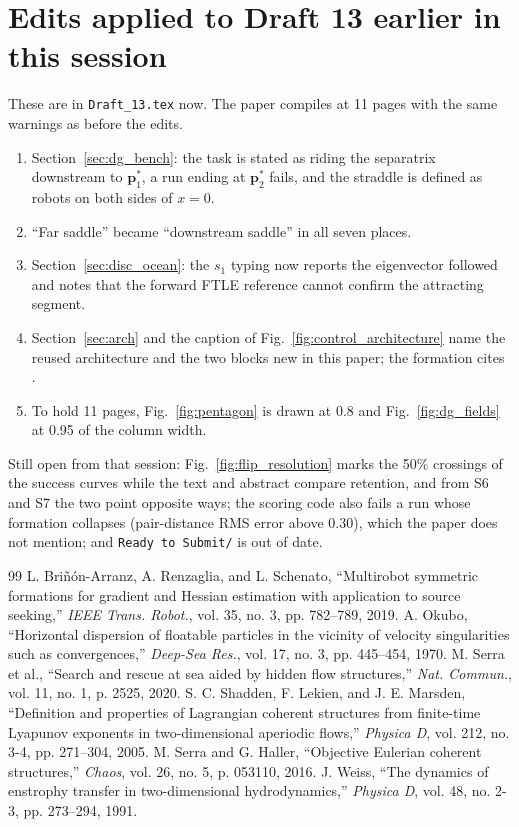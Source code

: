 \documentclass[11pt]{article}
\begin{document}
\section{Edits applied to Draft 13 earlier in this session}

These are in \texttt{Draft\_13.tex} now. The paper compiles at 11 pages
with the same warnings as before the edits.
\begin{enumerate}
\item Section~\ref{sec:dg_bench}: the task is stated as riding the
separatrix downstream to $\mathbf{p}^*_1$, a run ending at
$\mathbf{p}^*_2$ fails, and the straddle is defined as robots on both
sides of $x = 0$.
\item ``Far saddle'' became ``downstream saddle'' in all seven places.
\item Section~\ref{sec:disc_ocean}: the $s_1$ typing now reports the
eigenvector followed and notes that the forward FTLE reference cannot
confirm the attracting segment.
\item Section~\ref{sec:arch} and the caption of
Fig.~\ref{fig:control_architecture} name the reused architecture and the
two blocks new in this paper; the formation cites \cite{5}.
\item To hold 11 pages, Fig.~\ref{fig:pentagon} is drawn at 0.8 and
Fig.~\ref{fig:dg_fields} at 0.95 of the column width.
\end{enumerate}
Still open from that session: Fig.~\ref{fig:flip_resolution} marks the
50\% crossings of the success curves while the text and abstract compare
retention, and from S6 and S7 the two point opposite ways; the scoring
code also fails a run whose formation collapses (pair-distance RMS error
above 0.30), which the paper does not mention; and \texttt{Ready to
Submit/} is out of date.

\nocite{list5,list8,list12,list17,list19,list22}
\begin{thebibliography}{99}
 L. Bri\~{n}\'{o}n-Arranz, A. Renzaglia, and L. Schenato,
``Multirobot symmetric formations for gradient and Hessian estimation with
application to source seeking,'' \textit{IEEE Trans. Robot.}, vol. 35,
no. 3, pp. 782--789, 2019.
 A. Okubo, ``Horizontal dispersion of floatable particles in
the vicinity of velocity singularities such as convergences,''
\textit{Deep-Sea Res.}, vol. 17, no. 3, pp. 445--454, 1970.
 M. Serra et al., ``Search and rescue at sea aided by
hidden flow structures,'' \textit{Nat. Commun.}, vol. 11, no. 1, p. 2525,
2020.
 S. C. Shadden, F. Lekien, and J. E. Marsden,
``Definition and properties of Lagrangian coherent structures from
finite-time Lyapunov exponents in two-dimensional aperiodic flows,''
\textit{Physica D}, vol. 212, no. 3-4, pp. 271--304, 2005.
 M. Serra and G. Haller, ``Objective Eulerian coherent
structures,'' \textit{Chaos}, vol. 26, no. 5, p. 053110, 2016.
 J. Weiss, ``The dynamics of enstrophy transfer in
two-dimensional hydrodynamics,'' \textit{Physica D}, vol. 48, no. 2-3,
pp. 273--294, 1991.
\end{thebibliography}
\end{document}
